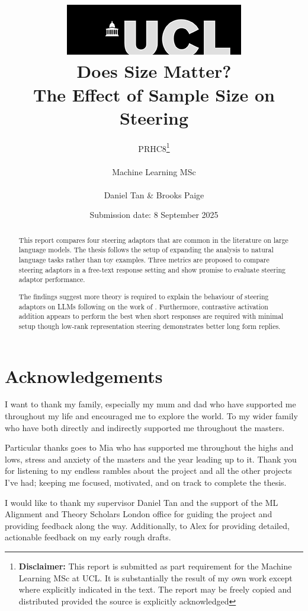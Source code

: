 \documentclass[tikz, 12pt]{report}
\title{{ \includegraphics[scale=.5]{figures/ucl_logo.png}}\\
{{\Huge Does Size Matter?}\\{\Large The Effect of Sample Size on Steering}}\\
}
\date{Submission date: 8 September 2025}
\author{PRHC8\thanks{
{\bf Disclaimer:}
This report is submitted as part requirement for the Machine Learning MSc at UCL. It is
substantially the result of my own work except where explicitly indicated in the text.
The report may be freely copied and distributed provided the source is explicitly acknowledged}
\\ \\
Machine Learning MSc\\ \\
Daniel Tan \& Brooks Paige}
\begin{document}
\linenumbers





\onehalfspacing
\maketitle

\chapter*{Acknowledgements}

I want to thank my family, especially my mum and dad who have supported me throughout my life and encouraged me to explore the world.
To my wider family who have both directly and indirectly supported me throughout the masters.

Particular thanks goes to Mia who has supported me throughout the highs and lows, stress and anxiety of the masters and the year leading up to it.
Thank you for listening to my endless rambles about the project and all the other projects I've had; keeping me focused, motivated, and on track to complete the thesis.

I would like to thank my supervisor Daniel Tan and the support of the ML Alignment and Theory Scholars London office for guiding the project and providing feedback along the way.
Additionally, to Alex for providing detailed, actionable feedback on my early rough drafts.

\begin{abstract}
    This report compares four steering adaptors that are common in the literature on large language models.
    The thesis follows the setup of \citet{steering-clear} expanding the analysis to natural language tasks rather than toy examples.
    Three metrics are proposed to compare steering adaptors in a free-text response setting and show promise to evaluate steering adaptor performance.

    The findings suggest more theory is required to explain the behaviour of steering adaptors on LLMs following on the work of \citet{steering-clear}.
    Furthermore, contrastive activation addition \citep{caa} appears to perform the best when short responses are required with minimal setup though low-rank representation steering \citep{steering-clear} demonstrates better long form replies.
\end{abstract}

\tableofcontents
\listoffigures
\listoftables
\clearpage
{}









\appendix
{}





\end{document}

